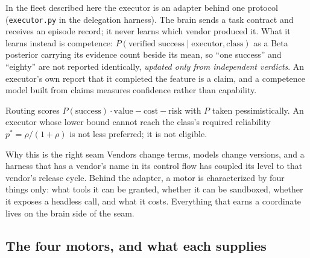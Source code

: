 \documentclass[11pt]{article}
\theoremstyle{definition}
\begin{document}
In the fleet described here the executor is an adapter behind one protocol (\texttt{executor.py} in the delegation harness). The brain sends a task contract and receives an episode record; it never learns which vendor produced it. What it learns instead is competence: $P(\text{verified success} \mid \text{executor}, \text{class})$ as a Beta posterior carrying its evidence count beside its mean, so ``one success'' and ``eighty'' are not reported identically, \emph{updated only from independent verdicts}. An executor's own report that it completed the feature is a claim, and a competence model built from claims measures confidence rather than capability.

Routing scores $P(\text{success})\cdot\text{value} - \text{cost} - \text{risk}$ with $P$ taken pessimistically. An executor whose lower bound cannot reach the class's required reliability $p^{*} = \rho/(1+\rho)$ is not less preferred; it is not eligible.

\begin{claimbox}{Why this is the right seam}
Vendors change terms, models change versions, and a harness that has a vendor's name in its control flow has coupled its level to that vendor's release cycle. Behind the adapter, a motor is characterized by four things only: what tools it can be granted, whether it can be sandboxed, whether it exposes a headless call, and what it costs. Everything that earns a coordinate lives on the brain side of the seam.
\end{claimbox}

\subsection{The four motors, and what each supplies}
\end{document}
